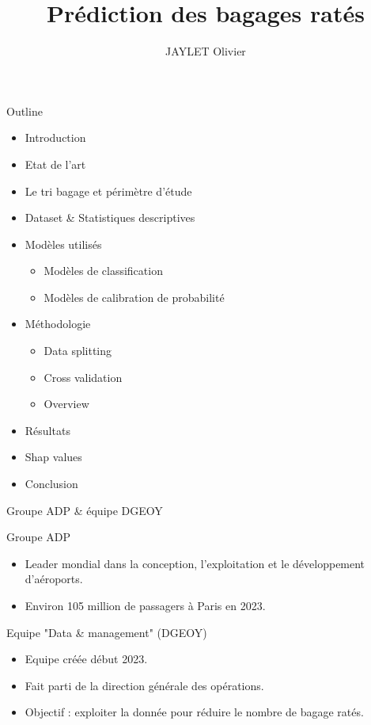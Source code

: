 \documentclass{beamer}
\title{Prédiction des bagages ratés}
\author{JAYLET Olivier}
\begin{document}
\begin{frame}
  \titlepage
\end{frame}

\begin{frame}{Outline}
    \begin{itemize}
        \item Introduction
        \item Etat de l'art
        \item Le tri bagage et périmètre d'étude
        \item Dataset \& Statistiques descriptives
        \item Modèles utilisés
            \begin{itemize}
                \item Modèles de classification
                \item Modèles de calibration de probabilité
            \end{itemize}
        \item Méthodologie
            \begin{itemize}
                \item Data splitting
                \item Cross validation
                \item Overview
            \end{itemize}
        \item Résultats
        \item Shap values
        \item Conclusion
    \end{itemize}
\end{frame}


\begin{frame}{Groupe ADP \& équipe DGEOY} 

\begin{block}{Groupe ADP}
\begin{itemize}
    \item Leader mondial dans la conception, l'exploitation et le développement d'aéroports.
    \item Environ 105 million de passagers à Paris en 2023.
\end{itemize}
\end{block}


\begin{block}{Equipe "Data \& management" (DGEOY)}
    \begin{itemize}
        \item Equipe créée début 2023.
        \item Fait parti de la direction générale des opérations.
        \item Objectif : exploiter la donnée pour réduire le nombre de bagage ratés.
    \end{itemize}
\end{block}
\end{frame}
\end{document}
